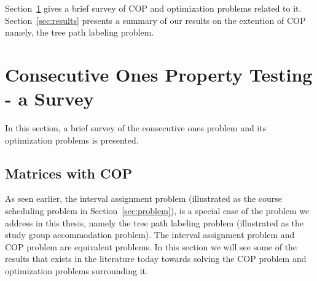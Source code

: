 \documentclass[MS,synopsis]{iitmdiss}
\def \secfirstparatrim {-5mm}
\begin{document}
Section~\ref{sec:background} gives a brief survey of COP and
optimization problems related to it.  Section~\ref{sec:results}
presents a summary of our results on the extention of COP namely, the
tree path labeling problem. 


\section{Consecutive Ones Property Testing - a Survey} %
\label{sec:background}
\vspace{\secfirstparatrim}
In this section, a brief survey of the consecutive ones problem and its
optimization problems is presented.

\subsection{Matrices with COP}
\label{sec:copmatrices}
\vspace{\secfirstparatrim} 
As seen earlier, the interval assignment problem (illustrated as the
course scheduling problem in Section~\ref{sec:problem}), is a special
case of the problem we address in this thesis, namely the tree path
labeling problem (illustrated as the study group accommodation
problem). The interval assignment problem and COP problem are equivalent
problems. In this section we will see some of the results that
exists in the literature today towards solving the COP problem and
optimization problems surrounding it.
\end{document}
